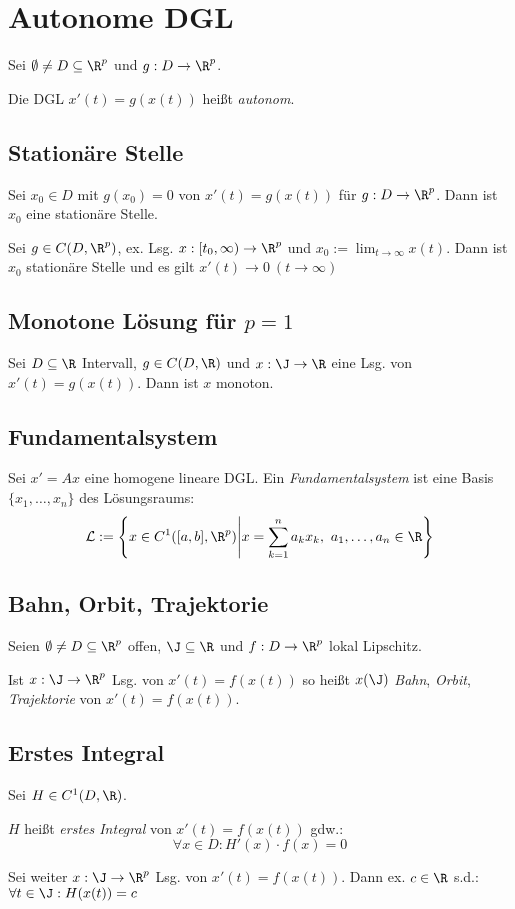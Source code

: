 \section*{Autonome DGL}

Sei \(\emptyset \neq D \subseteq \R^p\) und \(g : D \to \R^p\).

Die DGL \(x'(t)=g(x(t))\) heißt \emph{autonom}.

\subsection*{Stationäre Stelle}

Sei \(x_0 \in D\) mit \(g(x_0)=0\) von \(x'(t)=g(x(t))\) für \(g : D \to \R^p\). Dann ist \(x_0\) eine stationäre Stelle.

\spacing

Sei \(g \in C(D,\R^p)\), ex. Lsg. \(x: [t_0,\infty) \to \R^p\) und \(x_0 := \lim_{t \to \infty} x(t)\). Dann ist \(x_0\) stationäre Stelle und es gilt \(x'(t) \to 0 \ (t \to \infty)\)

\subsection*{Monotone Lösung für \(p=1\)}

Sei \(D \subseteq \R\) Intervall, \(g \in C(D,\R)\) und \(x : \J \to \R\) eine Lsg. von \(x'(t)=g(x(t))\). Dann ist \(x\) monoton.

\subsection*{Fundamentalsystem}

Sei \(x'=Ax\) eine homogene lineare DGL. Ein \emph{Fundamentalsystem} ist eine Basis \(\{x_1,\dots,x_n\}\) des Lösungsraums: \[\mathcal{L} := \left\{ x \in C^1([a,b],\R^p) \middle| x=\sum_{k=1}^n a_k x_k, \ a_1,\dots,a_n \in \R \right\}\]

\subsection*{Bahn, Orbit, Trajektorie}

Seien \(\emptyset \neq D \subseteq \R^p\) offen, \(\J \subseteq \R\) und \(f : D \to \R^p\) lokal Lipschitz.

Ist \(x : \J \to \R^p\) Lsg. von \(x'(t)=f(x(t))\) so heißt \(x(\J)\) \emph{Bahn}, \emph{Orbit}, \emph{Trajektorie} von \(x'(t)=f(x(t))\).

\subsection*{Erstes Integral}

Sei \(H \in C^1(D,\R)\).

\(H\) heißt \emph{erstes Integral} von \(x'(t)=f(x(t))\) gdw.: \[\forall x \in D : H'(x) \cdot f(x) = 0\]

Sei weiter \(x : \J \to \R^p\) Lsg. von \(x'(t)=f(x(t))\). Dann ex. \(c \in \R\) s.d.: \(\forall t \in \J : H(x(t))=c\)
